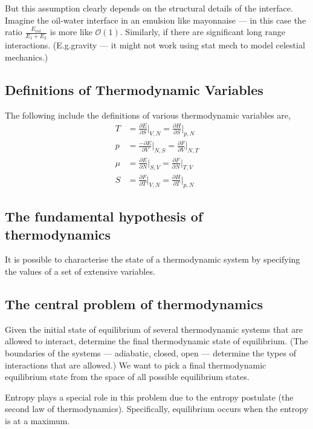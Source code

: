 \documentclass{article}
\begin{document}
But this assumption clearly depends on the structural details of the interface. Imagine the oil-water interface in an emulsion like mayonnaise --- in this case the ratio  $\frac{E_{int}}{E_1+E_2}$ is more like $\mathcal{O}(1)$.
Similarly, if there are significant long range interactions. (E.g.gravity --- it might not work using stat mech to model celestial mechanics.)

\subsection{Definitions of Thermodynamic Variables}

The following include the definitions of various thermodynamic variables are,
\begin{align*}
T &= \frac{\partial E}{\partial S}\vert_{V,N} = \frac{\partial H}{\partial S}\vert_{p,N} \\
p &= \frac{-\partial E}{\partial V}\vert_{N,S} = \frac{\partial F}{\partial V}\vert_{N,T} \\
\mu &= \frac{\partial E}{\partial N}\vert_{S,V} = \frac{\partial F}{\partial N}\vert_{T,V} \\
S &= \frac{\partial F}{\partial T}\vert_{V,N} = \frac{\partial H}{\partial T}\vert_{p,N}
\end{align*}

\subsection{The fundamental hypothesis of thermodynamics}
It is possible to characterise the state of a thermodynamic system by specifying the values of a set of extensive variables.

\subsection{The central problem of thermodynamics}
Given the initial state of equilibrium of several thermodynamic systems that are allowed to interact, determine the final thermodynamic state of equilibrium. (The boundaries of the systems --- adiabatic, closed, open --- determine the types of interactions that are allowed.) We want to pick a final thermodynamic equilibrium state from the space of all possible equilibrium states.

Entropy plays a special role in this problem due to the entropy postulate (the second law of thermodynamics). Specifically, equilibrium occurs when the entropy is at a maximum.
\end{document}
